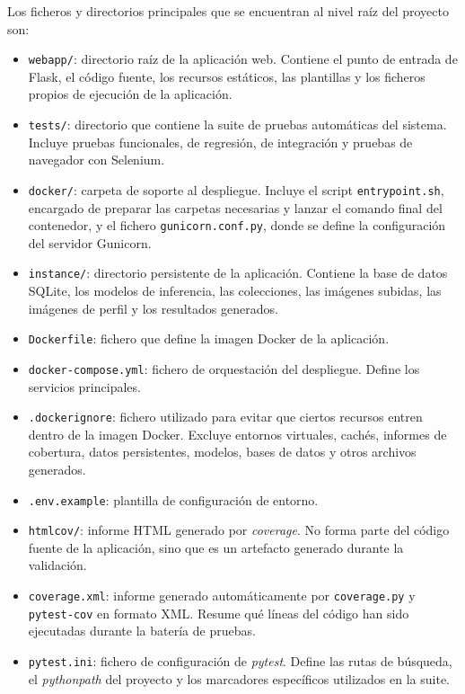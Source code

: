\endgroup

Los ficheros y directorios principales que se encuentran al nivel raíz del proyecto son:

\begin{itemize}
	\item \texttt{webapp/}: directorio raíz de la aplicación web.
	Contiene el punto de entrada de Flask, el código fuente, los recursos
	estáticos, las plantillas y los ficheros propios de ejecución de la
	aplicación.
	
	\item \texttt{tests/}: directorio que contiene la suite de
	pruebas automáticas del sistema. Incluye pruebas funcionales, de
	regresión, de integración y pruebas de navegador con Selenium.
	
	\item \texttt{docker/}: carpeta de soporte al despliegue. Incluye el script \texttt{entrypoint.sh}, encargado de preparar las carpetas necesarias y lanzar el comando final del contenedor, y el fichero \texttt{gunicorn.conf.py}, donde se define la configuración del servidor Gunicorn.
	
	\item \texttt{instance/}: directorio persistente de la aplicación. Contiene la base de datos SQLite, los modelos de inferencia, las colecciones, las imágenes subidas, las imágenes de perfil y los resultados generados. 
	
	\item \texttt{Dockerfile}: fichero que define la imagen Docker de la aplicación.
	
	\item \texttt{docker-compose.yml}: fichero de orquestación del despliegue. Define los servicios principales.
	
	\item \texttt{.dockerignore}: fichero utilizado para evitar que ciertos recursos entren dentro de la imagen Docker. Excluye entornos virtuales, cachés, informes de cobertura, datos persistentes, modelos, bases de datos y otros archivos generados.
	
	\item \texttt{.env.example}: plantilla de configuración de entorno.
	
	\item \texttt{htmlcov/}: informe HTML generado por \textit{coverage}. No forma parte del código fuente de la aplicación, sino que es un artefacto generado durante la validación.
	
	\item \texttt{coverage.xml}: informe generado automáticamente por \texttt{coverage.py} y \texttt{pytest-cov} en formato XML. Resume qué líneas del código han sido ejecutadas durante la batería de pruebas.
	
	\item \texttt{pytest.ini}: fichero de configuración de \textit{pytest}. Define las rutas de búsqueda, el \textit{pythonpath} del proyecto y los marcadores específicos utilizados en la suite.
\end{itemize}

